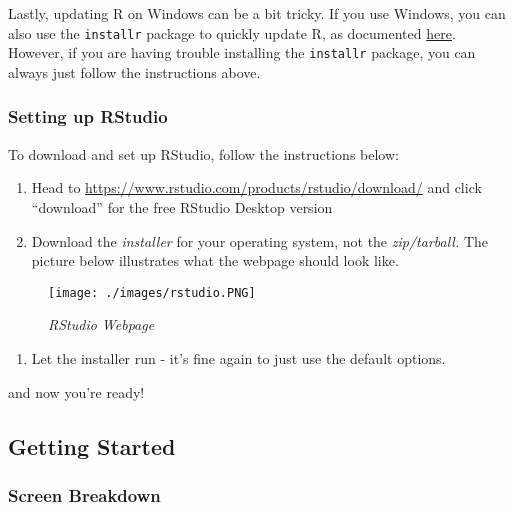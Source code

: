 \documentclass[
]{book}
\providecommand{\tightlist}{%
  \setlength{\itemsep}{0pt}\setlength{\parskip}{0pt}}
\begin{document}
Lastly, updating R on Windows can be a bit tricky. If you use Windows, you can also use the \texttt{installr} package to quickly update R, as documented \href{https://www.r-statistics.com/2015/06/a-step-by-step-screenshots-tutorial-for-upgrading-r-on-windows/}{here}. However, if you are having trouble installing the \texttt{installr} package, you can always just follow the instructions above.

\hypertarget{setting-up-rstudio}{%
\subsubsection{Setting up RStudio}\label{setting-up-rstudio}}

To download and set up RStudio, follow the instructions below:

\begin{enumerate}
\def\labelenumi{\arabic{enumi}.}
\item
  Head to \url{https://www.rstudio.com/products/rstudio/download/} and click ``download'' for the free RStudio Desktop version
\item
  Download the \emph{installer} for your operating system, not the \emph{zip/tarball.} The picture below illustrates what the webpage should look like.
\end{enumerate}

\begin{figure}
\centering
\texttt{[image: ./images/rstudio.PNG]}
\caption{\emph{RStudio Webpage}}
\end{figure}

\begin{enumerate}
\def\labelenumi{\arabic{enumi}.}
\setcounter{enumi}{2}
\tightlist
\item
  Let the installer run - it's fine again to just use the default options.
\end{enumerate}

and now you're ready!

\hypertarget{getting-started}{%
\subsection{Getting Started}\label{getting-started}}

\hypertarget{screen-breakdown}{%
\subsubsection{Screen Breakdown}\label{screen-breakdown}}
\end{document}
